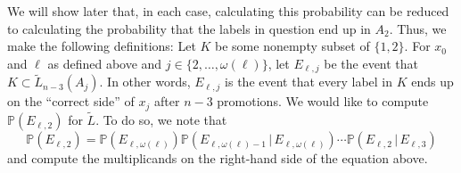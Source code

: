 \documentclass[11pt]{amsart}
\theoremstyle{definition}
\newcommand{\Prob}{\mathbb{P}}
\begin{document}
We will show later that, in each case, calculating this probability can be reduced to calculating the probability that the labels in question end up in $ A_2 $. Thus, we make the following definitions: Let $ K $ be some nonempty subset of $ \{1,2\} $. For $ x_0 $ and $ \ell $ as defined above and $ j\in\{2,\ldots,\omega(\ell)\} $, let $ E_{\ell,j} $ be the event that $ K\subset \tilde{L}_{n-3}(A_j) $. In other words, $ E_{\ell,j} $ is the event that every label in $ K $ ends up on the ``correct side'' of $ x_j $ after $ n-3 $ promotions. We would like to compute $ \Prob(E_{\ell,2}) $ for $ \tilde{L} $. To do so, we note that \begin{equation}\label{conditional prob}
	\Prob(E_{\ell,2})=\Prob(E_{\ell,\omega(\ell)})\Prob(E_{\ell,\omega(\ell)-1}\,|\,E_{\ell,\omega(\ell)})\cdots\Prob(E_{\ell,2}\,|\,E_{\ell,3})
\end{equation} and compute the multiplicands on the right-hand side of the equation above. 
\end{document}
